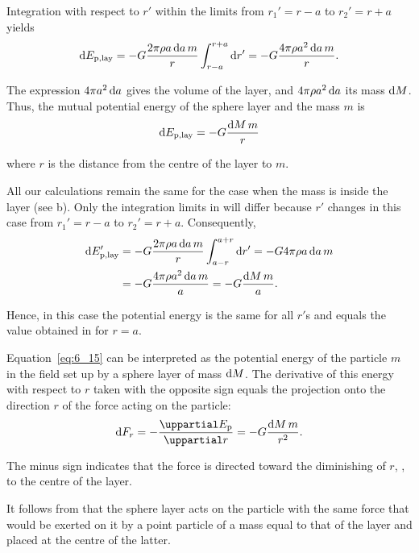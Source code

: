 \noindent
Integration with respect to $r'$ within the limits from $r_1'=r-a$ to $r_2'=r+a$ yields
\begin{equation}\label{eq:6_14}
	\mathrm{d} E_{\text{p,lay}} = -G\frac{2\pi\rho a\,\mathrm{d} a\,m}{r} \int_{r-a}^{r+a} \mathrm{d} r' = -G\frac{4\pi\rho a^2\,\mathrm{d} a\,m}{r}.
\end{equation}

\noindent
The expression $4\pi a^2\,\mathrm{d} a$ gives the volume of the layer, and $4\pi\rho a^2\,\mathrm{d} a$ its mass $\mathrm{d} M$. Thus, the mutual potential energy of the sphere layer and the mass $m$ is
\begin{equation}\label{eq:6_15}
	\mathrm{d} E_{\text{p,lay}} = -G\frac{\mathrm{d} M\,m}{r}
\end{equation}

\noindent
where $r$ is the distance from the centre of the layer to $m$.

All our calculations remain the same for the case when the mass is inside the layer (see b). Only the integration limits in  will differ because $r'$ changes in this case from $r_1'=r-a$ to $r_2'=r+a$. Consequently,
\begin{align}
	\mathrm{d} E_{\text{p,lay}}' &= -G\frac{2\pi\rho a\,\mathrm{d} a\,m}{r} \int_{a-r}^{a+r} \mathrm{d} r' = -G4\pi\rho a\,\mathrm{d} a\,m\nonumber\\
	& = -G \frac{4\pi\rho a^2\,\mathrm{d} a\,m}{a} = -G\frac{\mathrm{d} M\,m}{a}.\label{eq:6_16}
\end{align}

\noindent
Hence, in this case the potential energy is the same for all $r'$s and equals the value obtained in  for $r=a$.

Equation~\eqref{eq:6_15} can be interpreted as the potential energy of the particle $m$ in the field set up by a sphere layer of mass $\mathrm{d} M$. The derivative of this energy with respect to $r$ taken with the opposite sign equals the projection onto the direction $r$ of the force acting on the particle:
\begin{equation}\label{eq:6_17}
	\deriv{F_r} = -\diffpartial{E_{\text{p}}}{r} = -G\frac{\deriv{M}\,m}{r^2}.
\end{equation}

\noindent
The minus sign indicates that the force is directed toward the diminishing of $r$, \ie, to the centre of the layer.

It follows from  that the sphere layer acts on the particle with the same force that would be exerted on it by a point particle of a mass equal to that of the layer and placed at the centre of the latter.


